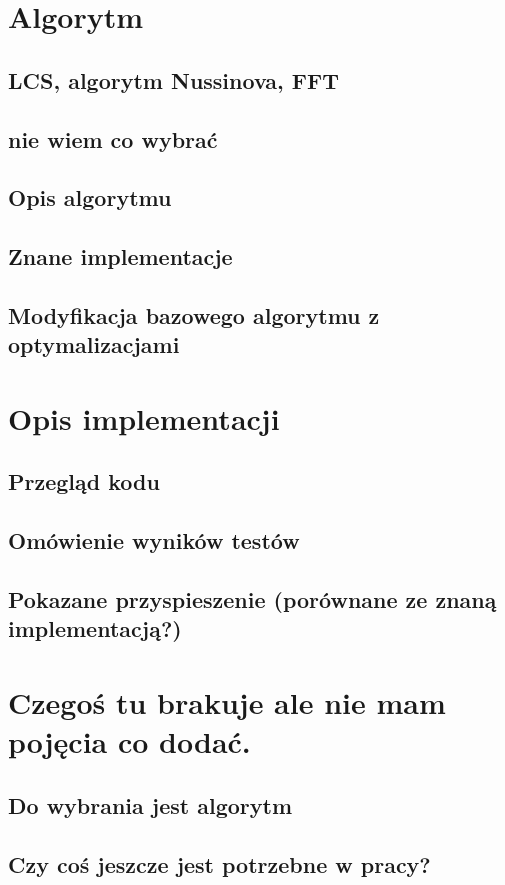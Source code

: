 \documentclass[a4paper,12pt]{book} %
\begin{document}
\chapter{Algorytm}
\section{LCS, algorytm Nussinova, FFT}
\section{nie wiem co wybrać}
\section{Opis algorytmu}
\section{Znane implementacje}
\section{Modyfikacja bazowego algorytmu z optymalizacjami}

\chapter{Opis implementacji}
\section{Przegląd kodu}
\section{Omówienie wyników testów}
\section{Pokazane przyspieszenie (porównane ze znaną implementacją?)}

\chapter{Czegoś tu brakuje ale nie mam pojęcia co dodać.}
\section{Do wybrania jest algorytm}
\section{Czy coś jeszcze jest potrzebne w pracy?}
\end{document}
